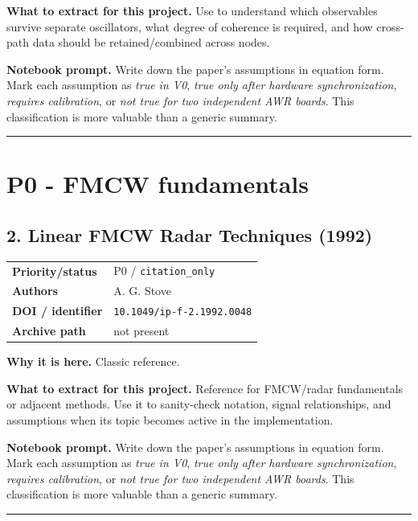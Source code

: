 \documentclass[10.5pt]{article}
\begin{document}
\textbf{What to extract for this project.} Use to understand which observables survive separate oscillators, what degree of coherence is required, and how cross-path data should be retained/combined across nodes.

\textbf{Notebook prompt.} Write down the paper's assumptions in equation form. Mark each assumption as \emph{true in V0}, \emph{true only after hardware synchronization}, \emph{requires calibration}, or \emph{not true for two independent AWR boards}. This classification is more valuable than a generic summary.

\vspace{0.35em}\hrule\vspace{0.65em}

\clearpage
\section{P0 - FMCW fundamentals}

\subsection*{2. Linear FMCW Radar Techniques (1992)}
\begin{tabularx}{\textwidth}{@{}p{}X@{}}
\textbf{Priority/status} & P0 / \nolinkurl{citation_only} \\
\textbf{Authors} & A. G. Stove \\
\textbf{DOI / identifier} & \nolinkurl{10.1049/ip-f-2.1992.0048} \\
\textbf{Archive path} & not present \\
\end{tabularx}
\textbf{Why it is here.} Classic reference.

\textbf{What to extract for this project.} Reference for FMCW/radar fundamentals or adjacent methods. Use it to sanity-check notation, signal relationships, and assumptions when its topic becomes active in the implementation.

\textbf{Notebook prompt.} Write down the paper's assumptions in equation form. Mark each assumption as \emph{true in V0}, \emph{true only after hardware synchronization}, \emph{requires calibration}, or \emph{not true for two independent AWR boards}. This classification is more valuable than a generic summary.

\vspace{0.35em}\hrule\vspace{0.65em}

\clearpage
\end{document}
